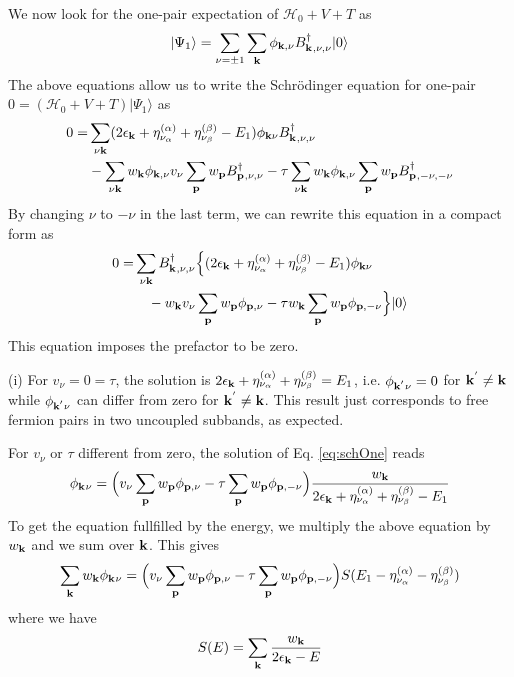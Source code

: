 \documentclass[11pt]{article} %
\begin{document}
We now look for the one-pair expectation of $\mathcal{H}_0+V+T$ as 
\begin{equation}
|\Psi_1\rangle=\sum_{\nu=\pm1}\sum_{\mathbf{k}}\phi_{\mathbf{k},\nu}B^{\dagger}_{\mathbf{k}^{ },\nu,\nu}|0\rangle
\end{equation}
The above equations allow us to write the Schr\"odinger equation for one-pair $0=(\mathcal{H}_0+V+T)|\Psi_1\rangle$ as 
\begin{equation}
\begin{split}
0=&\sum_{\nu\mathbf{k}}(2\epsilon_{\mathbf{k}}+\eta_{\nu_{\alpha}}^{(\alpha)}+\eta_{\nu_{\beta}}^{(\beta)}-E_1)\phi_{\mathbf{k}\nu}B^{\dagger}_{\mathbf{k}^{ },\nu,\nu}\\
&-\sum_{\nu\mathbf{k}}w_{\mathbf{k}}\phi_{\mathbf{k},\nu}v_{\nu}\sum_{\mathbf{p}}w_{\mathbf{p}}B^{\dagger}_{\mathbf{p}^{ },\nu,\nu}
 -\tau\sum_{\nu\mathbf{k}}w_{\mathbf{k}}\phi_{\mathbf{k},\nu}\sum_{\mathbf{p}}w_{\mathbf{p}}B^{\dagger}_{\mathbf{p}^{ },-\nu,-\nu}
\end{split}
\end{equation}
By changing $\nu$ to $-\nu$ in the last term, we can rewrite this equation in a compact form as 
\begin{equation}\label{eq:schOne}
\begin{split}
0=&\sum_{\nu\mathbf{k}}B^{\dagger}_{\mathbf{k}^{ },\nu,\nu}\Big\{(2\epsilon_{\mathbf{k}}+\eta_{\nu_{\alpha}}^{(\alpha)}+\eta_{\nu_{\beta}}^{(\beta)}-E_1)\phi_{\mathbf{k}\nu}\\
&\quad-w_{\mathbf{k}}v_{\nu}\sum_{\mathbf{p}}w_{\mathbf{p}}\phi_{\mathbf{p},\nu}-\tau{}w_{\mathbf{k}}\sum_{\mathbf{p}}w_{\mathbf{p}}\phi_{\mathbf{p},-\nu}\Big\}|0\rangle
\end{split}
\end{equation}
This equation imposes the prefactor to be zero. 

(i) For $v_{\nu}=0=\tau$, the solution is $2\epsilon_{\mathbf{k}}+\eta_{\nu_{\alpha}}^{(\alpha)}+\eta_{\nu_{\beta}}^{(\beta)}=E_1$, i.e. $\phi_{\mathbf{k}^{'}\nu}=0$ for $\mathbf{k}^{'}\neq\mathbf{k}$ while $\phi_{\mathbf{k}^{'}\nu}$ can differ from zero for  $\mathbf{k}^{'}\neq\mathbf{k}$. This result just corresponds to free fermion pairs in two uncoupled subbands, as expected. 

For $v_{\nu}$ or $\tau$ different from zero, the solution of Eq. \ref{eq:schOne} reads
\begin{equation}
\phi_{\mathbf{k}^{}\nu}=\Big(v_{\nu}\sum_{\mathbf{p}}w_{\mathbf{p}}\phi_{\mathbf{p},\nu}-\tau{}\sum_{\mathbf{p}}w_{\mathbf{p}}\phi_{\mathbf{p},-\nu}\Big)
\frac{w_{\mathbf{k}}}{2\epsilon_{\mathbf{k}}+\eta_{\nu_{\alpha}}^{(\alpha)}+\eta_{\nu_{\beta}}^{(\beta)}-E_1}
\end{equation}
To get the equation fullfilled by the energy, we multiply the above equation by $w_{\mathbf{k}}$ and we sum over $\mathbf{k}$.  This gives 
\begin{equation}
\sum_{\mathbf{k}}w_{\mathbf{k}}\phi_{\mathbf{k}^{}\nu}=\Big(v_{\nu}\sum_{\mathbf{p}}w_{\mathbf{p}}\phi_{\mathbf{p},\nu}-\tau{}\sum_{\mathbf{p}}w_{\mathbf{p}}\phi_{\mathbf{p},-\nu}\Big)
S(E_1-\eta_{\nu_{\alpha}}^{(\alpha)}-\eta_{\nu_{\beta}}^{(\beta)})
\end{equation}
where we have 
\begin{equation}
S(E)=\sum_{\mathbf{k}}\frac{w_{\mathbf{k}}}{2\epsilon_{\mathbf{k}}-E}
\end{equation}
\end{document}

